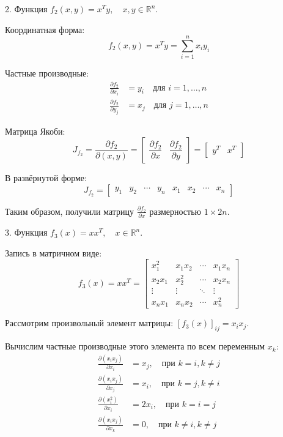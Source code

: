 \documentclass{article}
\begin{document}
2. Функция \( f_2(x, y) = x^T y, \quad x, y \in \mathbb{R}^n \).

\quad

Координатная форма:
\[
f_2(x, y) = x^T y = \sum_{i=1}^n x_i y_i
\]

Частные производные:
\begin{align*}
\frac{\partial f_2}{\partial x_i} &= y_i \quad \text{для } i = 1, \ldots, n \\
\frac{\partial f_2}{\partial y_j} &= x_j \quad \text{для } j = 1, \ldots, n
\end{align*}

Матрица Якоби:
\[
J_{f_2} = \frac{\partial f_2}{\partial (x, y)} = \begin{bmatrix}
\dfrac{\partial f_2}{\partial x} & \dfrac{\partial f_2}{\partial y}
\end{bmatrix} = \begin{bmatrix} y^T & x^T \end{bmatrix}
\]

В развёрнутой форме:
\[
J_{f_2} = \begin{bmatrix}
y_1 & y_2 & \cdots & y_n & x_1 & x_2 & \cdots & x_n
\end{bmatrix}
\]

Таким образом, получили матрицу \(\frac{\partial f_2}{\partial x}\) размерностью \(1 \times 2n\).

\quad

3. Функция \( f_3(x) = x x^T, \quad x \in \mathbb{R}^n \).

\quad

Запись в матричном виде:
\[
f_3(x) = x x^T = \begin{bmatrix}
x_1^2 & x_1x_2 & \cdots & x_1x_n \\
x_2x_1 & x_2^2 & \cdots & x_2x_n \\
\vdots & \vdots & \ddots & \vdots \\
x_nx_1 & x_nx_2 & \cdots & x_n^2
\end{bmatrix}
\]

Рассмотрим произвольный элемент матрицы: \([f_3(x)]_{ij} = x_i x_j\).

\quad

Вычислим частные производные этого элемента по всем переменным \(x_k\): 
\begin{align*}
\frac{\partial (x_i x_j)}{\partial x_i} &= x_j, \quad \text{при } k = i, k \neq j \\
\frac{\partial (x_i x_j)}{\partial x_j} &= x_i, \quad \text{при } k = j, k \neq i \\
\frac{\partial (x_i^2)}{\partial x_i} &= 2x_i, \quad \text{при } k = i = j \\
\frac{\partial (x_i x_j)}{\partial x_k} &= 0, \quad \text{при } k \neq i, k \neq j
\end{align*}
\end{document}
